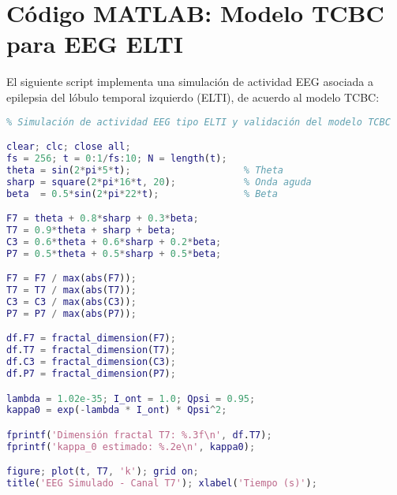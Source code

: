 \appendix
\section{Código MATLAB: Modelo TCBC para EEG ELTI}
\label{apx:tcbcscript}

El siguiente script implementa una simulación de actividad EEG asociada a epilepsia del lóbulo temporal izquierdo (ELTI), de acuerdo al modelo TCBC:

\begin{lstlisting}[language=Matlab, caption={Simulación de actividad EEG y validación TCBC}]
% modelo_TCBC.m
% Simulación de actividad EEG tipo ELTI y validación del modelo TCBC

clear; clc; close all;
fs = 256; t = 0:1/fs:10; N = length(t);
theta = sin(2*pi*5*t);                    % Theta
sharp = square(2*pi*16*t, 20);            % Onda aguda
beta  = 0.5*sin(2*pi*22*t);               % Beta

F7 = theta + 0.8*sharp + 0.3*beta;
T7 = 0.9*theta + sharp + beta;
C3 = 0.6*theta + 0.6*sharp + 0.2*beta;
P7 = 0.5*theta + 0.5*sharp + 0.5*beta;

F7 = F7 / max(abs(F7));
T7 = T7 / max(abs(T7));
C3 = C3 / max(abs(C3));
P7 = P7 / max(abs(P7));

df.F7 = fractal_dimension(F7);
df.T7 = fractal_dimension(T7);
df.C3 = fractal_dimension(C3);
df.P7 = fractal_dimension(P7);

lambda = 1.02e-35; I_ont = 1.0; Qpsi = 0.95;
kappa0 = exp(-lambda * I_ont) * Qpsi^2;

fprintf('Dimensión fractal T7: %.3f\n', df.T7);
fprintf('kappa_0 estimado: %.2e\n', kappa0);

figure; plot(t, T7, 'k'); grid on;
title('EEG Simulado - Canal T7'); xlabel('Tiempo (s)');
\end{lstlisting}
